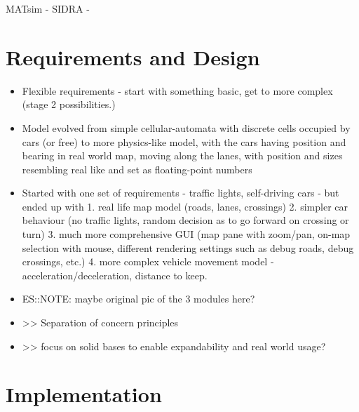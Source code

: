  MATsim -
 SIDRA -


\section{Requirements and Design}
\begin{itemize}
    \item Flexible requirements - start with something basic, get to more complex (stage 2 possibilities.)
    \item Model evolved from simple cellular-automata with discrete cells occupied by cars (or free) to more physics-like model, with the cars having position and bearing in real world map, moving along the lanes, with position and sizes resembling real like and set as floating-point numbers
    \item Started with one set of requirements - traffic lights, self-driving cars - but ended up with 1. real life map model (roads, lanes, crossings) 2. simpler car behaviour (no traffic lights, random decision as to go forward on crossing or turn) 3. much more comprehensive GUI (map pane with zoom/pan, on-map selection with mouse, different rendering settings such as debug roads, debug crossings, etc.) 4. more complex vehicle movement model - acceleration/deceleration, distance to keep.
	\item ES::NOTE: maybe original pic of the 3 modules here?
	\item >> Separation of concern principles
	\item >> focus on solid bases to enable expandability and real world usage?
\end{itemize}



\section{Implementation}


